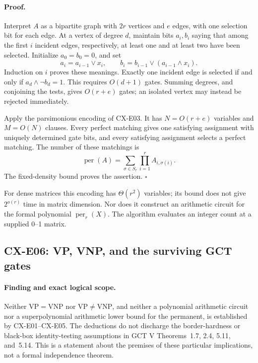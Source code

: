 \documentclass[11pt,a4paper]{article}
\begin{document}
\paragraph{Proof.}
Interpret \(A\) as a bipartite graph with \(2r\) vertices and \(e\)
edges, with one selection bit for each edge.
At a vertex of degree \(d\), maintain bits \(a_i,b_i\) saying that
among the first \(i\) incident edges, respectively, at least one and
at least two have been selected. Initialize \(a_0=b_0=0\), and set
\[
 a_i=a_{i-1}\vee x_i,\qquad
 b_i=b_{i-1}\vee(a_{i-1}\wedge x_i).
\]
Induction on \(i\) proves these meanings.
Exactly one incident edge is selected if and only if
\(a_d\wedge\neg b_d=1\).
This requires \(O(d+1)\) gates.
Summing degrees, and conjoining the tests, gives \(O(r+e)\) gates;
an isolated vertex may instead be rejected immediately.

Apply the parsimonious encoding of CX-E03.
It has \(N=O(r+e)\) variables and \(M=O(N)\) clauses.
Every perfect matching gives one satisfying assignment with uniquely
determined gate bits, and every satisfying assignment selects a
perfect matching.
The number of these matchings is
\[
 \operatorname{per}(A)=
 \sum_{\sigma\in S_r}\prod_{i=1}^r A_{i,\sigma(i)}.
\]
The fixed-density bound proves the assertion.
\hfill\(\square\)

For dense matrices this encoding has \(\Theta(r^2)\) variables; its
bound does not give \(2^{o(r)}\) time in matrix dimension.
Nor does it construct an arithmetic circuit for the formal
polynomial \(\operatorname{per}_r(X)\).
The algorithm evaluates an integer count at a supplied 0--1 matrix.

\subsection{CX-E06: VP, VNP, and the surviving GCT gates}
\label{finding:CX-E06}

\paragraph{Finding and exact logical scope.}
Neither \(\mathrm{VP}=\mathrm{VNP}\) nor
\(\mathrm{VP}\ne\mathrm{VNP}\), and neither a polynomial arithmetic
circuit nor a superpolynomial arithmetic lower bound for the
permanent, is established by CX-E01--CX-E05.
The deductions do not discharge the border-hardness or black-box
identity-testing assumptions in GCT V Theorems~1.7, 2.4, 5.11,
and~5.14. This is a statement about the premises of these particular
implications, not a formal independence theorem.
\end{document}
